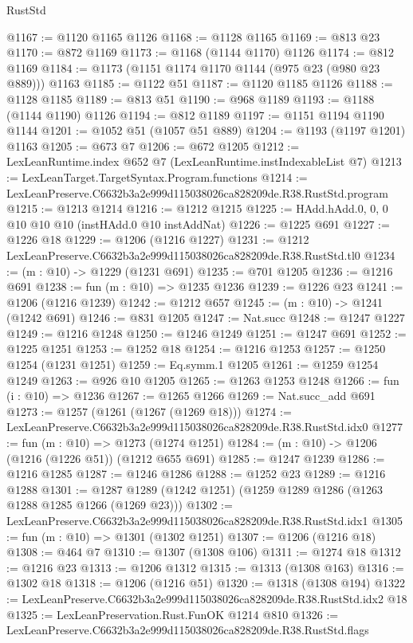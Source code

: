 \begin{lexlean}{RustStd}
\begin{coremodule}
@1167 := @1120 @1165 @1126
@1168 := @1128 @1165
@1169 := @813 @23
@1170 := @872 @1169
@1173 := @1168 (@1144 @1170) @1126
@1174 := @812 @1169
@1184 := @1173 (@1151 @1174 @1170 @1144 (@975 @23 (@980 @23 @889))) @1163
@1185 := @1122 @51
@1187 := @1120 @1185 @1126
@1188 := @1128 @1185
@1189 := @813 @51
@1190 := @968 @1189
@1193 := @1188 (@1144 @1190) @1126
@1194 := @812 @1189
@1197 := @1151 @1194 @1190 @1144
@1201 := @1052 @51 (@1057 @51 @889)
@1204 := @1193 (@1197 @1201) @1163
@1205 := @673 @7
@1206 := @672 @1205
@1212 := LexLeanRuntime.index @652 @7 (LexLeanRuntime.instIndexableList @7)
@1213 := LexLeanTarget.TargetSyntax.Program.functions
@1214 := LexLeanPreserve.C6632b3a2e999d115038026ca828209de.R38.RustStd.program
@1215 := @1213 @1214
@1216 := @1212 @1215
@1225 := HAdd.hAdd.{0, 0, 0} @10 @10 @10 (instHAdd.{0} @10 instAddNat)
@1226 := @1225 @691
@1227 := @1226 @18
@1229 := @1206 (@1216 @1227)
@1231 := @1212 LexLeanPreserve.C6632b3a2e999d115038026ca828209de.R38.RustStd.tl0
@1234 := (m : @10) -> @1229 (@1231 @691)
@1235 := @701 @1205
@1236 := @1216 @691
@1238 := fun (m : @10) => @1235 @1236
@1239 := @1226 @23
@1241 := @1206 (@1216 @1239)
@1242 := @1212 @657
@1245 := (m : @10) -> @1241 (@1242 @691)
@1246 := @831 @1205
@1247 := Nat.succ
@1248 := @1247 @1227
@1249 := @1216 @1248
@1250 := @1246 @1249
@1251 := @1247 @691
@1252 := @1225 @1251
@1253 := @1252 @18
@1254 := @1216 @1253
@1257 := @1250 @1254 (@1231 @1251)
@1259 := Eq.symm.{1} @1205
@1261 := @1259 @1254 @1249
@1263 := @926 @10 @1205
@1265 := @1263 @1253 @1248
@1266 := fun (i : @10) => @1236
@1267 := @1265 @1266
@1269 := Nat.succ_add @691
@1273 := @1257 (@1261 (@1267 (@1269 @18)))
@1274 := LexLeanPreserve.C6632b3a2e999d115038026ca828209de.R38.RustStd.idx0
@1277 := fun (m : @10) => @1273 (@1274 @1251)
@1284 := (m : @10) -> @1206 (@1216 (@1226 @51)) (@1212 @655 @691)
@1285 := @1247 @1239
@1286 := @1216 @1285
@1287 := @1246 @1286
@1288 := @1252 @23
@1289 := @1216 @1288
@1301 := @1287 @1289 (@1242 @1251) (@1259 @1289 @1286 (@1263 @1288 @1285 @1266 (@1269 @23)))
@1302 := LexLeanPreserve.C6632b3a2e999d115038026ca828209de.R38.RustStd.idx1
@1305 := fun (m : @10) => @1301 (@1302 @1251)
@1307 := @1206 (@1216 @18)
@1308 := @464 @7
@1310 := @1307 (@1308 @106)
@1311 := @1274 @18
@1312 := @1216 @23
@1313 := @1206 @1312
@1315 := @1313 (@1308 @163)
@1316 := @1302 @18
@1318 := @1206 (@1216 @51)
@1320 := @1318 (@1308 @194)
@1322 := LexLeanPreserve.C6632b3a2e999d115038026ca828209de.R38.RustStd.idx2 @18
@1325 := LexLeanPreservation.Rust.FunOK @1214 @810
@1326 := LexLeanPreserve.C6632b3a2e999d115038026ca828209de.R38.RustStd.flags

\end{coremodule}
\end{lexlean}
